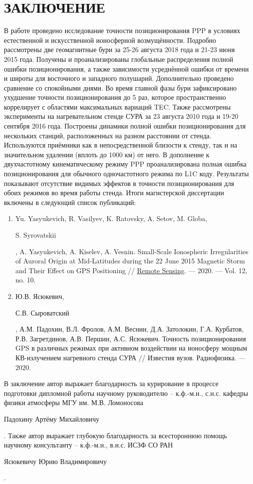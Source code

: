 \chapter*{ЗАКЛЮЧЕНИЕ}

В работе проведено исследование точности позиционирования PPP в условиях естественной и искусственной ионосферной возмущённости. 
Подробно рассмотрены две геомагнитные бури за 25-26 августа 2018 года и 21-23 июня 2015 года. 
Получены и проанализированы глобальные распределения полной ошибки позиционирования, а также зависимости усреднённой ошибки от времени и широты для восточного и западного полушарий. 
Дополнительно проведено сравнение со спокойными днями. 
Во время главной фазы бури зафиксировано ухудшение точности позиционирования до 5 раз, которое пространственно коррелирует с областями максимальных вариаций TEC.  
Также рассмотрены эксперименты на нагревательном стенде СУРА за 23 августа 2010 года и 19-20 сентября 2016 года.
Построены динамики полной ошибки позиционирования для нескольких станций, расположенных на разном расстоянии от стенда.
Используются приёмники как в непосредственной близости к стенду, так и на значительном удалении (вплоть до 1000 км) от него.
В дополнение к двухчастотному кинематическому режиму PPP проанализирована полная ошибка позиционирования для обычного одночастотного режима по L1C коду.
Результаты показывают отсутствие видимых эффектов в точности позиционирования для обоих режимов во время работы стенда.
Итоги магистерской диссертации включены в следующий список публикаций:
\begin{enumerate}[leftmargin=*]
\item Yu. Yasyukevich, R. Vasilyev, K. Ratovsky, A. Setov, M. Globa, \begin{bf}S. Syrovatskii\end{bf}, A. Yasyukevich, A. Kiselev, A. Vesnin. Small-Scale Ionospheric Irregularities of Auroral Origin at Mid-Latitudes during the 22 June 2015 Magnetic Storm and Their Effect on GPS Positioning // \href{http://dx.doi.org/10.3390/rs12101579}{Remote Sensing}. --- 2020. --- Vol. 12, no. 10. 
\item Ю.В. Ясюкевич, \begin{bf}С.В. Сыроватский\end{bf}, А.М. Падохин, В.Л. Фролов, А.М. Веснин, Д.А. Затолокин, Г.А. Курбатов, Р.В. Загретдинов, А.В. Першин, А.С. Ясюкевич. Точность позиционирования GPS в различных режимах при активном воздействии на ионосферу мощным КВ-излучением нагревного стенда СУРА // Известия вузов. Радиофизика. --- 2020. 
\end{enumerate}

В заключение автор выражает благодарность за курирование в процессе подготовки дипломной работы научному руководителю -- к.ф.-м.н., с.н.с. кафедры физики атмосферы МГУ им. М.В. Ломоносова \begin{bf}Падохину Артёму Михайловичу\end{bf}. 
Также автор выражает глубокую благодарность за всестороннюю помощь научному консультанту -- к.ф.-м.н., в.н.с. ИСЗФ СО РАН \begin{bf}Ясюкевичу Юрию Владимировичу\end{bf}.  